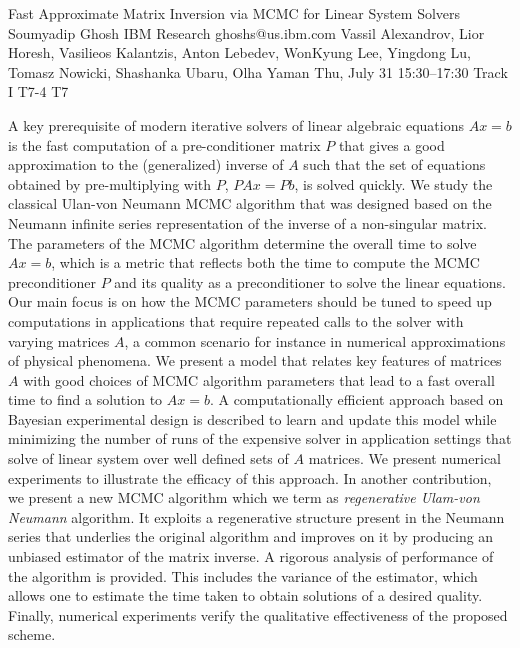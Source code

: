 \begin{talk}
  {Fast Approximate Matrix Inversion via MCMC for Linear System Solvers}%
  {Soumyadip Ghosh}%
  {IBM Research}%
  {ghoshs@us.ibm.com}%
  {Vassil Alexandrov, Lior Horesh, Vasilieos Kalantzis, Anton Lebedev,  WonKyung Lee, Yingdong Lu, Tomasz Nowicki, Shashanka Ubaru, Olha Yaman}%
  {}%
  {Thu, July 31 15:30–17:30 Track I}%
  {T7-4}%
  {T7}%
  
				
			
A key prerequisite of modern iterative solvers of linear algebraic equations $Ax=b$ is the fast computation of a pre-conditioner matrix $P$ that gives a good approximation to the (generalized) inverse of $A$ such that the set of equations obtained by pre-multiplying with $P$, $PAx=Pb$, is solved quickly. 
We study the classical Ulan-von Neumann MCMC algorithm that was designed based on the Neumann infinite series representation of the inverse of a non-singular matrix. The parameters of the MCMC algorithm determine the overall time to solve $Ax=b$, which is a metric that 
reflects both the time to compute the MCMC preconditioner $P$ and its quality as a preconditioner to solve the linear equations. Our main focus is on how the MCMC parameters should be tuned to speed up computations in applications that require repeated calls to the solver with varying matrices $A$, a common scenario for instance in numerical approximations of physical phenomena. 
We present a model that relates key features of matrices $A$ with good choices of MCMC algorithm parameters that lead to a fast overall time to find a solution to $Ax=b$. A computationally efficient approach based on Bayesian experimental design is described to learn and update this model while minimizing the number of runs of the expensive solver in application settings that solve of linear system over well defined sets of $A$ matrices. We present numerical experiments to illustrate the efficacy of this approach.
In another contribution, we present a new MCMC algorithm which we term as \emph{regenerative Ulam-von Neumann} algorithm. It exploits a regenerative structure present in the Neumann series that underlies the original algorithm and improves on it by producing an unbiased estimator of the matrix inverse. A rigorous analysis of performance of the algorithm is provided. This includes the variance of the estimator, which allows one to estimate the time taken to obtain solutions of a desired quality. Finally, numerical experiments verify the qualitative effectiveness of the proposed scheme. 

\end{talk}

